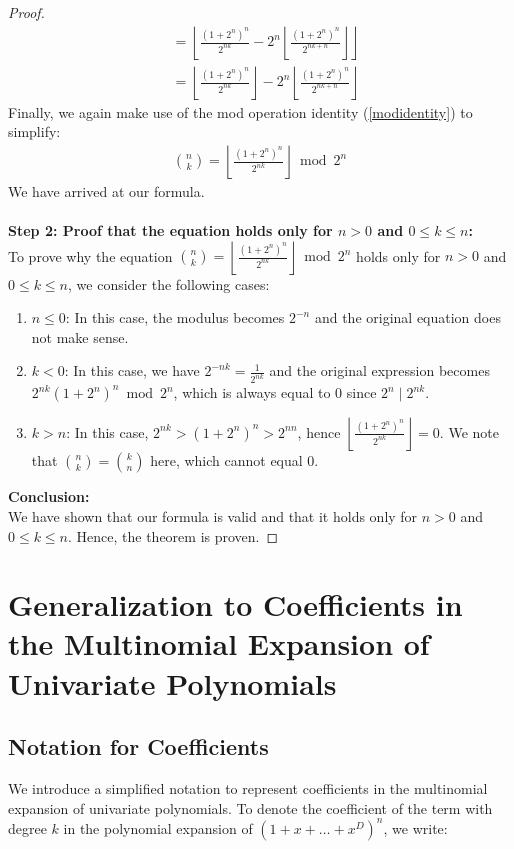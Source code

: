 \documentclass{article}
\theoremstyle{plain}
\begin{document}
\begin{proof}
\begin{align}
&= \left\lfloor\frac{(1 + 2^{n})^{n}}{2^{n k}} - 2^{n} \left\lfloor \frac{(1 + 2^{n})^{n}}{2^{n k + n}} \right\rfloor\right\rfloor \\
&= \left\lfloor\frac{(1 + 2^{n})^{n}}{2^{n k}}\right\rfloor - 2^{n} \left\lfloor \frac{(1 + 2^{n})^{n}}{2^{n k + n}} \right\rfloor
\end{align}
Finally, we again make use of the mod operation identity (\ref{modidentity}) to simplify:
\begin{align}
\binom{n}{k} = \left\lfloor\frac{(1 + 2^{n})^{n}}{2^{n k}}\right\rfloor \bmod{2^{n}}
\end{align}
We have arrived at our formula.
\\
\\
\textbf{Step 2: Proof that the equation holds only for $n > 0$ and $0 \leq k \leq n$:}
\\
To prove why the equation $\binom{n}{k} = \left\lfloor\frac{(1 + 2^n)^n}{2^{nk}}\right\rfloor \bmod{2^n}$ holds only for $n > 0$ and $0 \leq k \leq n$, we consider the following cases:

\begin{enumerate}
\item $n \leq 0$: In this case, the modulus becomes $2^{-n}$ and the original equation does not make sense.

\item $k < 0$: In this case, we have $2^{-nk} = \frac{1}{2^{nk}}$ and the original expression becomes $2^{nk} (1 + 2^n)^n \bmod{2^n}$, which is always equal to $0$ since $2^{n} \mid 2^{nk}$.

\item $k > n$: In this case, $2^{nk} > (1 + 2^n)^n > 2^{nn}$, hence $\left\lfloor\frac{(1 + 2^n)^n}{2^{nk}}\right\rfloor = 0$. We note that $\binom{n}{k} = \binom{k}{n}$ here, which cannot equal $0$.
\end{enumerate}
\noindent
\textbf{Conclusion:}
\\
We have shown that our formula is valid and that it holds only for $n > 0$ and $0 \leq k \leq n$. Hence, the theorem is proven.
\end{proof}

\section{Generalization to Coefficients in the Multinomial Expansion of Univariate Polynomials}
\subsection{Notation for Coefficients}
We introduce a simplified notation to represent coefficients in the multinomial expansion of univariate polynomials. To denote the coefficient of the term with degree \( k \) in the polynomial expansion of \( (1 + x + \ldots + x^D)^n \), we write:
\end{document}
